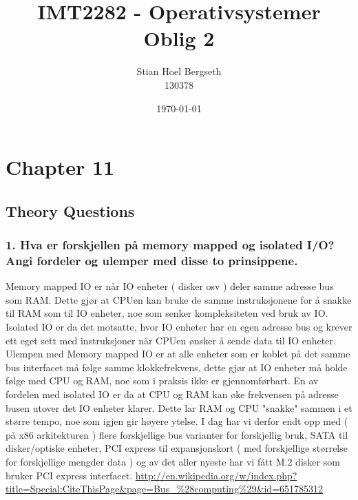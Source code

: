\documentclass[11pt]{article}
\title{IMT2282 - Operativsystemer \\
	Oblig 2}
\author{Stian Hoel Bergseth \\
	130378}
\date{\today}
\begin{document}
\maketitle

\section{Chapter 11}
\subsection{Theory Questions}
\setcounter{subsection}{6}
\subsubsection{1. Hva er forskjellen på memory mapped og isolated I/O? Angi fordeler og ulemper med disse to prinsippene.}

Memory mapped IO er når IO enheter ( disker osv ) deler samme adresse bus som RAM. Dette gjør at CPUen kan bruke de samme instruksjonene for å snakke til RAM som til IO enheter, noe som senker kompleksiteten ved bruk av IO. Isolated IO er da det motsatte, hvor IO enheter har en egen adresse bus og krever ett eget sett med instruksjoner når CPUen ønsker å sende data til IO enheter. Ulempen med Memory mapped IO er at alle enheter som er koblet på det samme bus interfacet må følge samme klokkefrekvens, dette gjør at IO enheter må holde følge med CPU og RAM, noe som i praksis ikke er gjennomførbart. En av fordelen med isolated IO er da at CPU og RAM kan øke frekvensen på adresse busen utover det IO enheter klarer. Dette lar RAM og CPU "snakke" sammen i et større tempo, noe som igjen gir høyere ytelse. 
I dag har vi derfor endt opp med ( på x86 arkitekturen ) flere forskjellige bus varianter for forskjellig bruk, SATA til disker/optiske enheter, PCI express til expansjonskort ( med forskjellige størrelse for forskjellige mengder data ) og av det aller nyeste har vi fått M.2 disker som bruker PCI express interfacet.  \url{http://en.wikipedia.org/w/index.php?title=Special:CiteThisPage&page=Bus_%28computing%29&id=651785312}
\end{document}
